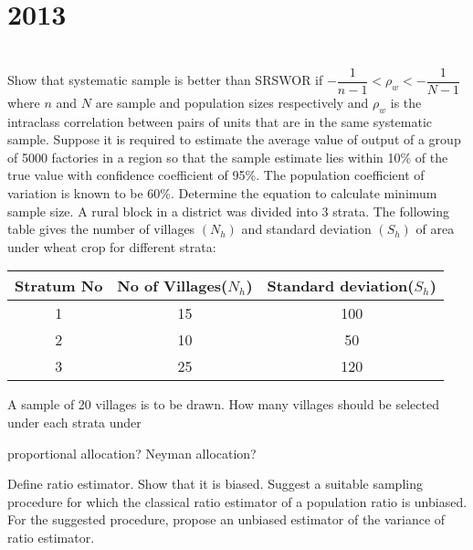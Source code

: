 \section*{2013}
\vspace{-.5cm}
\hrulefill \smallskip\\
 Show that systematic sample is better than SRSWOR if $-\dfrac{1}{n -1} <\rho_w <-\dfrac{1}{N-1}$ where $n$ and $N$ are sample and population sizes respectively and $\rho_w$ is the intraclass correlation between pairs of units that are in the same systematic sample.
\myline
{} Suppose it is required to estimate the average value of output of a group of 5000 factories in a region so that the sample estimate lies within 10\% of the true value with confidence coefficient of 95\%. The population coefficient of variation is known to be  60\%. Determine the equation to calculate minimum sample size.
\myline
{} A rural block in a district was divided into 3 strata. The following table gives the number of villages $(N_h)$ and standard deviation $(S_h)$ of area under wheat crop for different strata:
\begin{center}
 \begin{tabular}{|*{3}{c|}} \hline
    Stratum No & No of Villages($N_h$) & Standard deviation($S_h$) \\ \hline
    1 & 15 & 100 \\ \hline
    2 & 10 & 50 \\ \hline
    3 & 25 & 120 \\ \hline
\end{tabular}   
\end{center} A sample of 20 villages is to be drawn. How many villages should be selected under each strata under \begin{tasks}
\task proportional allocation?
\task Neyman allocation? \end{tasks}
 Define ratio estimator. Show that it is biased. Suggest a suitable sampling procedure for which the classical ratio estimator of a population ratio is unbiased. For the suggested procedure, propose an unbiased estimator of the variance of ratio estimator.